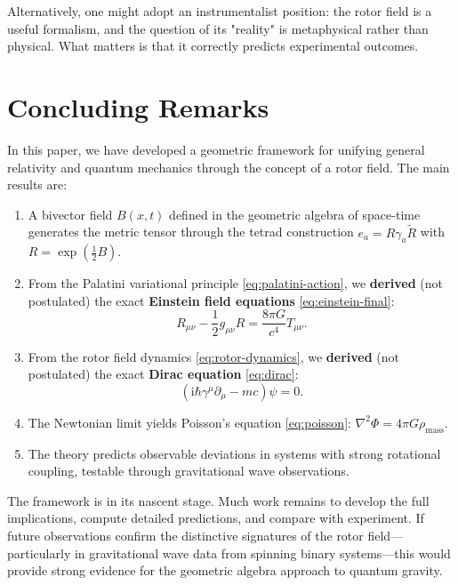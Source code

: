 \documentclass[11pt,a4paper]{article}
\numberwithin{equation}{section}
\theoremstyle{plain}
\theoremstyle{definition}
\theoremstyle{remark}
\newcommand{\ii}{\mathrm{i}}
\begin{document}
Alternatively, one might adopt an instrumentalist position: the rotor field is a useful formalism, and the question of its "reality" is metaphysical rather than physical. What matters is that it correctly predicts experimental outcomes.

\section{Concluding Remarks}
\label{sec:conclusion}

In this paper, we have developed a geometric framework for unifying general relativity and quantum mechanics through the concept of a rotor field. The main results are:

\begin{enumerate}
  \item A bivector field $B(x,t)$ defined in the geometric algebra of space-time generates the metric tensor through the tetrad construction $e_a = R\gamma_a\widetilde{R}$ with $R = \exp(\frac{1}{2}B)$.
  \item From the Palatini variational principle \eqref{eq:palatini-action}, we \textbf{derived} (not postulated) the exact \textbf{Einstein field equations} \eqref{eq:einstein-final}:
  \begin{equation*}
  R_{\mu\nu} - \frac{1}{2}g_{\mu\nu}R = \frac{8\pi G}{c^4} T_{\mu\nu}.
  \end{equation*}
  \item From the rotor field dynamics \eqref{eq:rotor-dynamics}, we \textbf{derived} (not postulated) the exact \textbf{Dirac equation} \eqref{eq:dirac}:
  \begin{equation*}
  (\ii\hbar\gamma^\mu \partial_\mu - mc)\psi = 0.
  \end{equation*}
  \item The Newtonian limit yields Poisson's equation \eqref{eq:poisson}: $\nabla^2\Phi = 4\pi G\rho_{\mathrm{mass}}$.
  \item The theory predicts observable deviations in systems with strong rotational coupling, testable through gravitational wave observations.
\end{enumerate}

The framework is in its nascent stage. Much work remains to develop the full implications, compute detailed predictions, and compare with experiment. If future observations confirm the distinctive signatures of the rotor field---particularly in gravitational wave data from spinning binary systems---this would provide strong evidence for the geometric algebra approach to quantum gravity.
\end{document}

